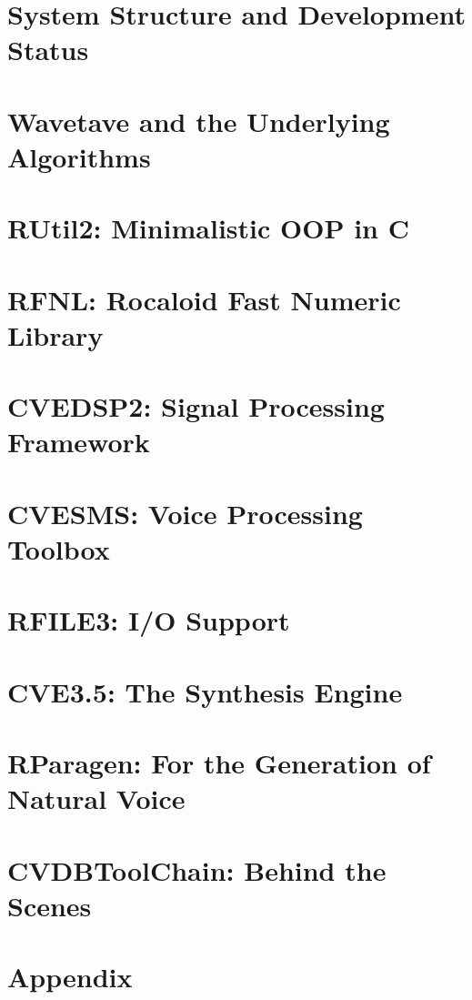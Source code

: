 \chapter{System Structure and Development Status}



\chapter{Wavetave and the Underlying Algorithms}



\chapter{RUtil2: Minimalistic OOP in C}

\chapter{RFNL: Rocaloid Fast Numeric Library}

\chapter{CVEDSP2: Signal Processing Framework}

\chapter{CVESMS: Voice Processing Toolbox}

\chapter{RFILE3: I/O Support}

\chapter{CVE3.5: The Synthesis Engine}

\chapter{RParagen: For the Generation of Natural Voice}

\chapter{CVDBToolChain: Behind the Scenes}

\chapter{Appendix}

